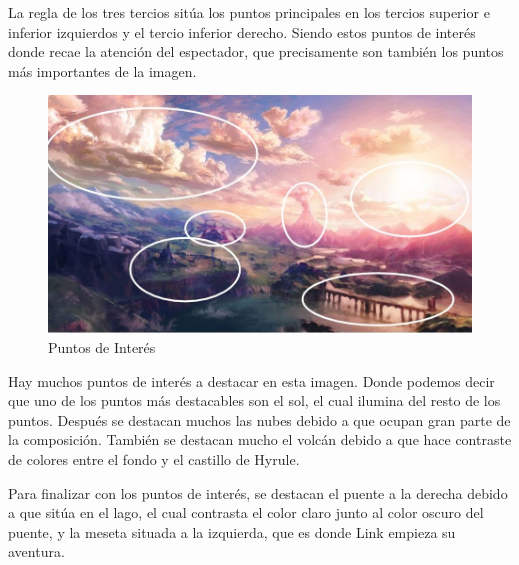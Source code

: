 \documentclass[12pt]{article}
\begin{document}
          La regla de los tres tercios sitúa los puntos principales en los tercios superior e inferior izquierdos y el tercio inferior derecho. 
          Siendo estos puntos de interés donde recae la atención del espectador, que precisamente son también los puntos más importantes de la imagen.
          \newpage
          \begin{figure}[H]
            \centering
            \includegraphics[scale = 0.4]{images/Jesus/Seccion2/Group 5.JPEG}
            \caption{\small {Puntos de Interés}}
          \end{figure}
          Hay muchos puntos de interés a destacar en esta imagen. Donde podemos decir que uno de los puntos más destacables son el sol, el cual ilumina del resto de los puntos.
          Después se destacan muchos las nubes debido a que ocupan gran parte de la composición. 
          También se destacan mucho el volcán debido a que hace contraste de colores entre el fondo y el castillo de Hyrule. 

          Para finalizar con los puntos de interés, se destacan el puente a la derecha debido a que sitúa en el lago, el cual contrasta el color claro junto al color oscuro del puente, y la meseta situada a la izquierda, que es donde Link empieza su aventura.
          
\end{document}
